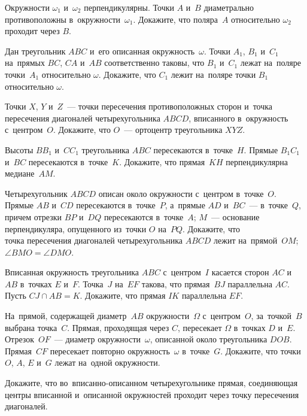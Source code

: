 



\begin{problems}

\item
Окружности $\omega_{1}$ и~$\omega_{2}$ перпендикулярны.
Точки $A$ и~$B$ диаметрально противоположны в~окружности~$\omega_{1}$.
Докажите, что поляра~$A$ относительно $\omega_{2}$ проходит через $B$.

\item
Дан треугольник $ABC$ и~его описанная окружность~$\omega$.
Точки $A_{1}$, $B_{1}$ и~$C_{1}$ на~прямых $BC$, $CA$ и~$AB$ соответственно
таковы, что $B_{1}$ и~$C_{1}$ лежат на~поляре точки~$A_{1}$
относительно $\omega$.
Докажите, что $C_{1}$ лежит на~поляре точки $B_{1}$ относительно $\omega$.

\item
Точки $X$, $Y$ и~$Z$~--- точки пересечения противоположных сторон и~точка
пересечения диагоналей четырехугольника $ABCD$, вписанного в~окружность
с~центром~$O$.
Докажите, что $O$~--- ортоцентр треугольника $XYZ$.

\item
Высоты $BB_{1}$ и~$CC_{1}$ треугольника $ABC$ пересекаются в~точке~$H$.
Прямые $B_{1}C_{1}$ и~$BC$ пересекаются в~точке~$K$.
Докажите, что прямая~$KH$ перпендикулярна медиане~$AM$.

\item
Четырехугольник $ABCD$ описан около окружности с~центром в~точке~$O$.
Прямые $AB$ и~$CD$ пересекаются в~точке~$P$, а~прямые $AD$ и~$BC$~---
в~точке~$Q$, причем отрезки $BP$ и~$DQ$ пересекаются в~точке~$A$;
$M$~--- основание перпендикуляра, опущенного из~точки $O$ на~$PQ$.
Докажите, что
\\
\subproblem
точка пересечения диагоналей четырехугольника $ABCD$ лежит на~прямой~$OM$;
\\
\subproblem
$\angle BMO = \angle DMO$.

\item
Вписанная окружность треугольника $ABC$ с~центром~$I$ касается
сторон $AC$ и~$AB$ в~точках $E$ и~$F$.
Точка~$J$ на~$EF$ такова, что прямая~$BJ$ параллельна $AC$.
Пусть $CJ \cap AB = K$.
Докажите, что прямая $IK$ параллельна $EF$.

\item
На~прямой, содержащей диаметр~$AB$ окружности~$\Omega$ с~центром~$O$,
за~точкой~$B$ выбрана точка~$C$.
Прямая, проходящая через $C$, пересекает $\Omega$ в~точках $D$ и~$E$.
Отрезок~$OF$~--- диаметр окружности~$\omega$, описанной около
треугольника $DOB$.
Прямая~$CF$ пересекает повторно окружность~$\omega$ в~точке~$G$.
Докажите, что точки $O$, $A$, $E$ и~$G$ лежат на~одной окружности.

\item
Докажите, что во~вписанно-описанном четырехугольнике прямая, соединяющая центры
вписанной и~описанной окружностей проходит через точку пересечения диагоналей.

\end{problems}


